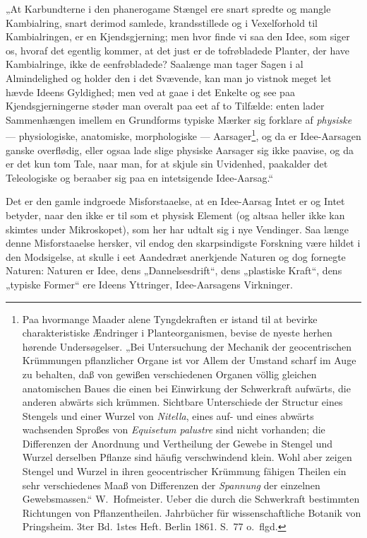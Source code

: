\documentclass[11pt]{book}
\newcommand{\opage}[1]{\marginnote{\footnotesize\textit{[#1]}}}
\begin{document}
„At Karbundterne i den phanerogame Stængel ere snart spredte og mangle
Kambialring, snart derimod samlede, krandsstillede og i Vexelforhold til
Kambialringen, er en Kjendsgjerning; men hvor finde vi saa den Idee, som
siger os, hvoraf det
\opage{308} \setcounter{footnote}{0}%
egentlig kommer, at det just er de tofrøbladede Planter, der have
Kambialringe, ikke de eenfrøbladede? Saalænge man tager Sagen i al
Almindelighed og holder den i det Svævende, kan man jo vistnok meget let
hævde Ideens Gyldighed; men ved at gaae i det Enkelte og see paa
Kjendsgjerningerne støder man overalt paa eet af to Tilfælde: enten lader
Sammenhængen imellem en Grundforms typiske Mærker sig forklare af
\emph{physiske} --- physiologiske, anatomiske, morphologiske ---
Aarsager\footnote{Paa hvormange Maader alene Tyngdekraften er istand til at
bevirke charakteristiske Ændringer i Planteorganismen, bevise de nyeste
herhen hørende Undersøgelser. „Bei Untersuchung der Mechanik der
geocentrischen Krümmungen pflanzlicher Organe ist vor Allem der Umstand
scharf im Auge zu behalten, daß von gewißen verschiedenen Organen völlig
gleichen anatomischen Baues die einen bei Einwirkung der Schwerkraft
aufwärts, die anderen abwärts sich krümmen. Sichtbare Unterschiede der
Structur eines Stengels und einer Wurzel von \textit{Nitella},
eines auf- und eines abwärts wachsenden Sproßes von
\textit{Equisetum palustre} sind
nicht vorhanden; die Differenzen der Anordnung und Vertheilung der Gewebe in
Stengel und Wurzel derselben Pflanze sind häufig verschwindend klein. Wohl
aber zeigen Stengel und Wurzel in ihren geocentrischer Krümmung fähigen
Theilen ein sehr verschiedenes Maaß von Differenzen der \emph{Spannung} der
einzelnen Gewebsmassen.“ W.~Hofmeister. Ueber die durch die Schwerkraft
bestimmten Richtungen von Pflanzentheilen. Jahrbücher für wissenschaftliche
Botanik von Pringsheim. 3ter Bd. 1stes Heft. Berlin 1861. S.~77 o.~flgd.},
og da er Idee-Aarsagen ganske overflødig, eller ogsaa lade slige physiske
Aarsager sig ikke paavise, og da er det kun tom Tale, naar man, for at
skjule sin Uvidenhed, paakalder det Teleologiske og beraaber sig paa en
intetsigende Idee-Aarsag.“

Det er den gamle indgroede Misforstaaelse, at en Idee-Aarsag Intet er og
Intet betyder, naar den ikke er til som et physisk Element (og altsaa heller
ikke kan skimtes under Mikroskopet), som her har udtalt sig i nye Vendinger.
Saa\-%
\opage{309} \setcounter{footnote}{0}%
længe denne Misforstaaelse hersker, vil endog den skarpsindigste Forskning
være hildet i den Modsigelse, at skulle i eet Aandedræt anerkjende Naturen
og dog fornegte Naturen: Naturen er Idee, dens „Dannelsesdrift“, dens
„plastiske Kraft“, dens „typiske Former“ ere Ideens Yttringer,
Idee-Aarsagens Virkninger.
\end{document}
